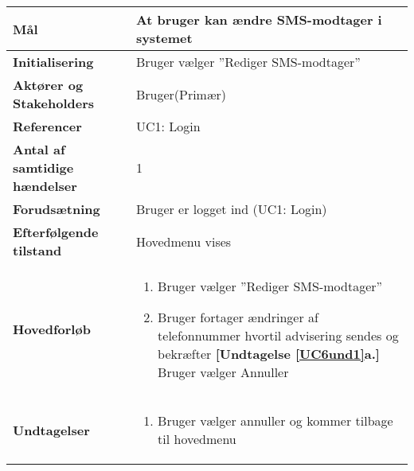 \begin{table}[H] \centering
\begin{tabular}{|p{6cm}|p{8cm}|}
	\hline
\textbf{Mål} &
At bruger kan ændre SMS-modtager i systemet\\\hline

\textbf{Initialisering} &
Bruger vælger ''Rediger SMS-modtager'' \\\hline
 
\textbf{Aktører og Stakeholders} &
Bruger(Primær) \\\hline

\textbf{Referencer} &
UC1: Login  \\\hline

\textbf{Antal af samtidige hændelser} &
1  \\\hline

\textbf{Forudsætning} &
Bruger er logget ind (UC1: Login)\\\hline

\textbf{Efterfølgende tilstand} &
Hovedmenu vises  \\\hline

\textbf{Hovedforløb} &
\begin{enumerate}

\item Bruger vælger ''Rediger SMS-modtager''
\item \label{UC6und1}Bruger fortager ændringer af telefonnummer hvortil advisering sendes og bekræfter \newline
\textbf{[Undtagelse \ref{UC6und1}a.]} Bruger vælger Annuller

\end{enumerate}   
 \\\hline
 
\textbf{Undtagelser}
&\begin{enumerate}[label= \ref{UC6und1}a.]
\item Bruger vælger annuller og kommer tilbage til hovedmenu
\end{enumerate}
 \\\hline
 

	\end{tabular}
	\label{UC6} 
\end{table}